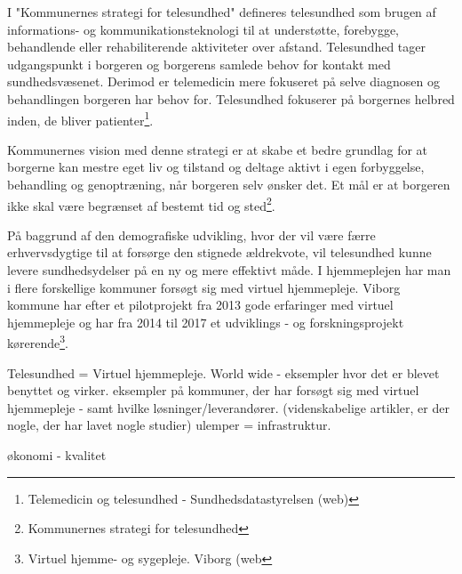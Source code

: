 I "Kommunernes strategi for telesundhed" defineres telesundhed som brugen af informations- og kommunikationsteknologi til at understøtte, forebygge, behandlende eller rehabiliterende aktiviteter over afstand. Telesundhed tager udgangspunkt i borgeren og borgerens samlede behov for kontakt med sundhedsvæsenet. Derimod er telemedicin mere fokuseret på selve diagnosen og behandlingen borgeren har behov for. Telesundhed fokuserer på borgernes helbred inden, de bliver patienter\footnote{Telemedicin og telesundhed - Sundhedsdatastyrelsen (web)}.

Kommunernes vision med denne strategi er at skabe et bedre grundlag for at borgerne kan mestre eget liv og tilstand og deltage aktivt i egen forbyggelse, behandling og genoptræning, når borgeren selv ønsker det. Et mål er at borgeren ikke skal være begrænset af bestemt tid og sted\footnote{Kommunernes strategi for telesundhed}.

På baggrund af den demografiske udvikling, hvor der vil være færre erhvervsdygtige til at forsørge den stignede ældrekvote, vil telesundhed kunne levere sundhedsydelser på en ny og mere effektivt måde. I hjemmeplejen har man i flere forskellige kommuner forsøgt sig med virtuel hjemmepleje. Viborg kommune har efter et pilotprojekt fra 2013 gode erfaringer med virtuel hjemmepleje og har fra 2014 til 2017 et  udviklings - og forskningsprojekt kørerende\footnote{Virtuel hjemme- og sygepleje. Viborg (web}.  


  


 

 


Telesundhed = Virtuel hjemmepleje. World wide - eksempler hvor det er blevet benyttet og virker. eksempler på kommuner, der har forsøgt sig med virtuel hjemmepleje - samt hvilke løsninger/leverandører. (videnskabelige artikler, er der nogle, der har lavet nogle studier) 
ulemper = infrastruktur.

økonomi - kvalitet 
 

